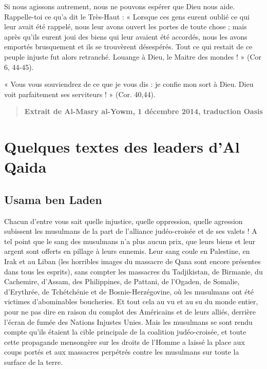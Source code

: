 Si nous agissons autrement, nous ne pouvons espérer que Dieu nous aide.
Rappelle-toi ce qu'a dit le Très-Haut : « Lorsque ces gens eurent oublié
ce qui leur avait été rappelé, nous leur avons ouvert les portes de
toute chose ; mais après qu'ils eurent joui des biens qui leur avaient
été accordés, nous les avons emportés brusquement et ils se trouvèrent
désespérés. Tout ce qui restait de ce peuple injuste fut alors
retranché. Louange à Dieu, le Maitre des mondes ! » (Cor 6, 44-45).

« Vous vous souviendrez de ce que je vous dis : je confie mon sort à
Dieu. Dieu voit parfaitement ses serviteurs ! » (Cor. 40,44).

\begin{quote}
\textbf{Extrait de Al-Masry al-Yowm, 1 décembre 2014, traduction Oasis}
\end{quote}



\hypertarget{quelques-textes-des-leaders-dal-qaida}{%
\section{Quelques textes des leaders d'Al
Qaida}\label{quelques-textes-des-leaders-dal-qaida}}


\subsection{Usama ben Laden}

Chacun d'entre vous sait quelle injustice, quelle oppression, quelle
agression subissent les musulmans de la part de l'alliance judéo-croisée
et de ses valets ! A tel point que le sang des musulmans n'a plus aucun
prix, que leurs biens et leur argent sont offerts en pillage à leurs
ennemis. Leur sang coule en Palestine, en Irak et au Liban (les
horribles images du massacre de Qana sont encore présentes dans tous les
esprits), sans compter les massacres du Tadjikistan, de Birmanie, du
Cachemire, d'Assam, des Philippines, de Pattani, de l'Ogaden, de
Somalie, d'Erythrée, de Tchétchénie et de Bosnie-Herzégovine, où les
musulmans ont été victimes d'abominables boucheries. Et tout cela au vu
et au su du monde entier, pour ne pas dire en raison du complot des
Américains et de leurs alliés, derrière l'écran de fumée des Nations
Injustes Unies. Mais les musulmans se sont rendu compte qu'ils étaient
la cible principale de la coalition judéo-croisée, et toute cette
propagande mensongère sur les droits de l'Homme a laissé la place aux
coups portés et aux massacres perpétrés contre les musulmans sur toute
la surface de la terre.

